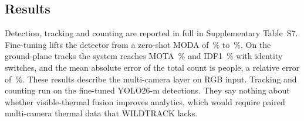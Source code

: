 \subsection{Results}
Detection, tracking and counting are reported in full in Supplementary Table~S7. Fine-tuning lifts the detector from a zero-shot MODA of \camDetZeroShotModa{}\,\% to \camDetFineTunedModa{}\,\%. On the ground-plane tracks the system reaches MOTA \camTrackMota{}\,\% and IDF1 \camTrackIdfOne{}\,\% with \camTrackSwitches{} identity switches, and the mean absolute error of the total count is \camCountMae{} people, a relative error of \camCountRelErr{}\,\%. These results describe the multi-camera layer on RGB input. Tracking and counting run on the fine-tuned YOLO26-m detections. They say nothing about whether visible-thermal fusion improves analytics, which would require paired multi-camera thermal data that WILDTRACK lacks.
